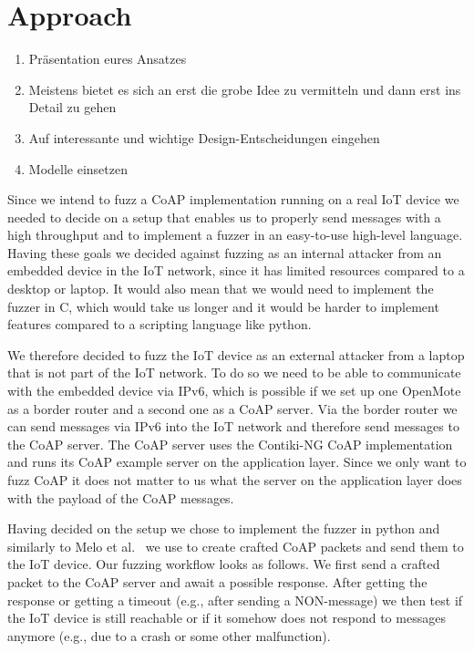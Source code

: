 \section{Approach} \label{approach}

\begin{enumerate}
	\item Präsentation eures Ansatzes
	\item Meistens bietet es sich an erst die grobe Idee zu vermitteln und dann erst ins Detail zu gehen
	\item Auf interessante und wichtige Design-Entscheidungen eingehen
	\item Modelle einsetzen
\end{enumerate}

Since we intend to fuzz a CoAP implementation running on a real IoT device we needed to decide on a setup that enables us to properly send messages with a high throughput and to implement a fuzzer in an easy-to-use high-level language. Having these goals we decided against fuzzing as an internal attacker from an embedded device in the IoT network, since it has limited resources compared to a desktop or laptop. It would also mean that we would need to implement the fuzzer in C, which would take us longer and it would be harder to implement features compared to a scripting language like python.

We therefore decided to fuzz the IoT device as an external attacker from a laptop that is not part of the IoT network. To do so we need to be able to communicate with the embedded device via IPv6, which is possible if we set up one OpenMote as a border router and a second one as a CoAP server. Via the border router we can send messages via IPv6 into the IoT network and therefore send messages to the CoAP server. The CoAP server uses the Contiki-NG CoAP implementation and runs its CoAP example server on the application layer. Since we only want to fuzz CoAP it does not matter to us what the server on the application layer does with the payload of the CoAP messages.

Having decided on the setup we chose to implement the fuzzer in python and similarly to Melo et al.~\cite{Melo2017RobustnessTO} we use \scapy to create crafted CoAP packets and send them to the IoT device. Our fuzzing workflow looks as follows. We first send a crafted packet to the CoAP server and await a possible response. After getting the response or getting a timeout (e.g., after sending a NON-message) we then test if the IoT device is still reachable or if it somehow does not respond to messages anymore (e.g., due to a crash or some other malfunction). 

